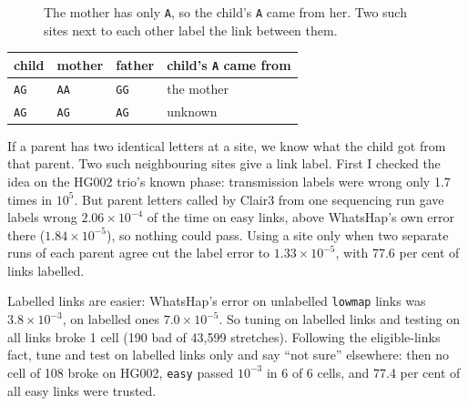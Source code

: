 \documentclass[11pt]{article}
\newcommand{\dna}[1]{\texttt{#1}}
\newcommand{\grp}[1]{\texttt{#1}}
\begin{document}
\begin{figure}[h]
\centering
{}
\caption{The mother has only \dna{A}, so the child's \dna{A} came from her.
Two such sites next to each other label the link between them.}
\label{fig:trio}
\end{figure}

\begin{center}
\small
\begin{tabular}{@{}llll@{}}
\toprule
child & mother & father & child's \dna{A} came from\\
\midrule
\dna{AG} & \dna{AA} & \dna{GG} & the mother\\
\dna{AG} & \dna{AG} & \dna{AG} & unknown\\
\bottomrule
\end{tabular}
\end{center}

If a parent has two identical letters at a site, we know what the child got
from that parent. Two such neighbouring sites give a link label. First I
checked the idea on the HG002 trio's known phase: transmission labels were
wrong only 1.7 times in $10^5$. But parent letters called by Clair3 from one
sequencing run gave labels wrong $2.06\times10^{-4}$ of the time on easy
links, above WhatsHap's own error there ($1.84\times10^{-5}$), so nothing
could pass. Using a site only when two separate runs of each parent agree
cut the label error to $1.33\times10^{-5}$, with 77.6 per cent of links
labelled.

Labelled links are easier: WhatsHap's error on unlabelled \grp{lowmap}
links was $3.8\times10^{-3}$, on labelled ones $7.0\times10^{-5}$. So tuning
on labelled links and testing on all links broke 1 cell (190 bad of
43{,}599 stretches). Following the eligible-links fact, tune and test on
labelled links only and say \enquote{not sure} elsewhere: then no cell of 108
broke on HG002, \grp{easy} passed $10^{-3}$ in 6 of 6 cells,
and 77.4 per cent of all easy links were trusted.
\end{document}
